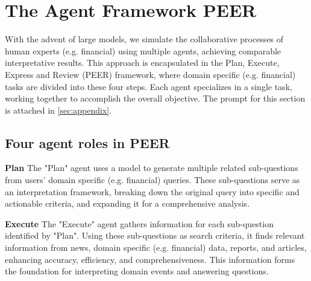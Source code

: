 \documentclass[11pt]{article}
\begin{document}
\section{The Agent Framework PEER}
\label{sec:2}
With the advent of large models, we simulate the collaborative processes of human experts (e.g. financial) using multiple agents, achieving comparable interpretative results. This approach is encapsulated in the Plan, Execute, Express and Review (PEER) framework, where domain specific (e.g. financial) tasks are divided into these four steps. Each agent specializes in a single task, working together to accomplish the overall objective. The prompt for this section is attached in \ref{sec:appendix}.
\subsection{Four agent roles in PEER}
\textbf{Plan}
The "Plan" agent uses a model to generate multiple related sub-questions from users’ domain specific (e.g. financial) queries. These sub-questions serve as an interpretation framework, breaking down the original query into specific and actionable criteria, and expanding it for a comprehensive analysis. 

\textbf{Execute}
The "Execute" agent gathers information for each sub-question identified by "Plan". Using these sub-questions as search criteria, it finds relevant information from news, domain specific (e.g. financial) data, reports, and articles, enhancing accuracy, efficiency, and comprehensiveness. This information forms the foundation for interpreting domain events and answering questions.
\end{document}
